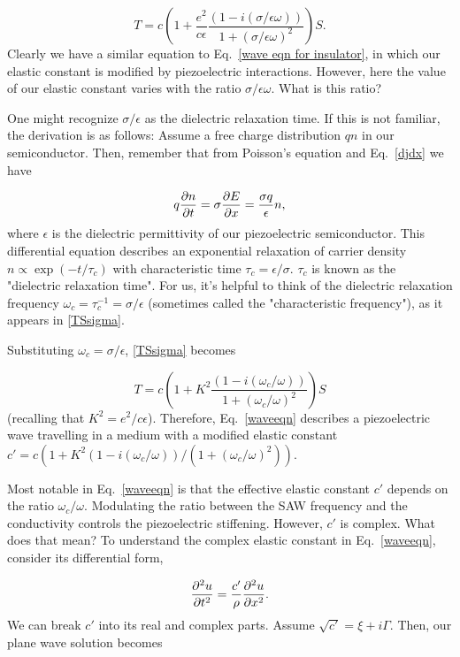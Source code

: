 \documentclass[double,12pt,1in,seploa]{beavtex}
\begin{document}
\begin{equation}
    T = c(1 + \frac{e^2}{c\epsilon}\frac{(1-i(\sigma/\epsilon\omega))}{1+(\sigma/\epsilon\omega)^2})S. \label{TSsigma}
\end{equation}
Clearly we have a similar equation to Eq.\ \ref{wave eqn for insulator}, in which our elastic constant is modified by piezoelectric interactions. However, here the value of our elastic constant varies with the ratio $\sigma/\epsilon\omega$. What is this ratio?

One might recognize $\sigma/\epsilon$ as the dielectric relaxation time. If this is not familiar, the derivation is as follows: Assume a free charge distribution $qn$ in our semiconductor. Then, remember that from Poisson's equation and Eq.\ \ref{djdx} we have

\begin{equation}
    q\pdv{n}{t} = \sigma\pdv{E}{x} = \frac{\sigma q}{\epsilon}n, 
\end{equation}
where $\epsilon$ is the dielectric permittivity of our piezoelectric semiconductor. This differential equation describes an exponential relaxation of carrier density $n \propto \exp(-t/\tau_c)$ with characteristic time $\tau_c = \epsilon/\sigma$. $\tau_c$ is known as the "dielectric relaxation time". For us, it's helpful to think of the dielectric relaxation frequency $\omega_c = \tau_c^{-1} = \sigma/\epsilon$ (sometimes called the "characteristic frequency"), as it appears in \ref{TSsigma}. 

Substituting $\omega_c = \sigma/\epsilon$, \ref{TSsigma} becomes

\begin{equation}
    T = c(1 + K^2\frac{(1-i(\omega_c/\omega))}{1+(\omega_c/\omega)^2})S \label{waveeqn}
\end{equation}
(recalling that $K^2 = e^2/c\epsilon$). Therefore, Eq.\ \ref{waveeqn} describes a piezoelectric wave travelling in a medium with a modified elastic constant $c' = c(1 + K^2(1-i(\omega_c/\omega))/(1+(\omega_c/\omega)^2))$.

Most notable in Eq.\ \ref{waveeqn} is that the effective elastic constant $c'$ depends on the ratio $\omega_c/\omega$. Modulating the ratio between the SAW frequency and the conductivity controls the piezoelectric stiffening. However, $c'$ is complex. What does that mean? To understand the complex elastic constant in Eq.\ \ref{waveeqn}, consider its differential form,

\begin{equation}
    \pdv[2]{u}{t} = \frac{c'}{\rho} \pdv[2]{u}{x}.
\end{equation}
We can break $c'$ into its real and complex parts. Assume $\sqrt{c'} = \xi + i\Gamma$. Then, our plane wave solution becomes
\end{document}
